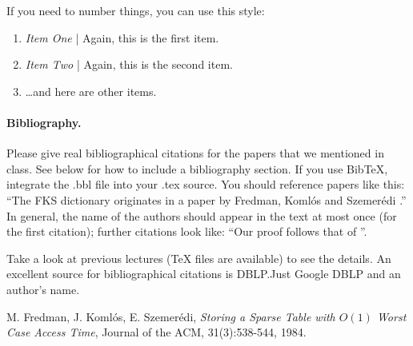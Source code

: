 \documentclass{notes}
\begin{document}
If you need to number things, you can use this style:
\begin{enumerate}
\item {\em Item One\/} | Again, this is the first item.
\item {\em Item Two\/} | Again, this is the second item.
\item \dots and here are other items.
\end{enumerate}

\paragraph{Bibliography.}
Please give real bibliographical citations for the papers that we
mentioned in class. See below for how to include a bibliography section.
If you use BibTeX, integrate the .bbl file into your .tex
source. You should reference papers like this: ``The FKS
dictionary originates in a paper by Fredman, Koml\'{o}s and
Szemer\'{e}di \cite{fks}.'' In general, the name of the authors should
appear in the text at most once (for the first citation); further
citations look like: ``Our proof follows that of \cite{fks}''.

Take a look at previous lectures (TeX files are available) to see the details. An excellent source for bibliographical citations is DBLP.\@ Just Google DBLP and an author's name.


%


\begin{thebibliography}{5}

M. Fredman, J. Koml\'{o}s, E. Szemer\'{e}di,
\emph{Storing a Sparse Table with $O(1)$ Worst Case Access Time},
Journal of the ACM, 31(3):538-544, 1984.

\end{thebibliography}

\end{document}
